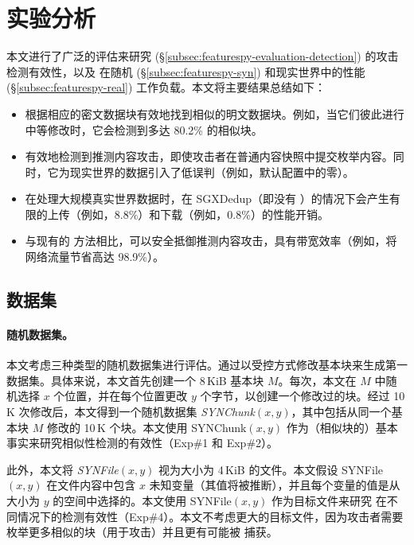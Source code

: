 \section{实验分析}
\label{sec:featurespy-evaluation}


本文进行了广泛的评估来研究 \sysnameF (\S\ref{subsec:featurespy-evaluation-detection}) 的攻击检测有效性，以及 \prototype 在随机 (\S\ref{subsec:featurespy-syn}) 和现实世界中的性能(\S\ref{subsec:featurespy-real}) 工作负载。本文将主要结果总结如下：

\begin{itemize}[leftmargin=*]
\item \sysnameF 根据相应的密文数据块有效地找到相似的明文数据块。例如，当它们彼此进行中等修改时，它会检测到多达 80.2\% 的相似块。
\item \sysnameF 有效地检测到推测内容攻击，即使攻击者在普通内容快照中提交枚举内容。同时，它为现实世界的数据引入了低误判（例如，默认配置中的零）。
\item \prototype 在处理大规模真实世界数据时，在 SGXDedup（即没有 \sysnameF）的情况下会产生有限的上传（例如，8.8\%）和下载（例如，0.8\%）的性能开销。
\item 与现有的 \cite{harnik2010side, li15} 方法相比，可以安全抵御推测内容攻击，\prototype 具有带宽效率（例如，将网络流量节省高达 98.9\%）。
\end{itemize}


\subsection{数据集}
\label{subsec:featurespy-datasets}

\paragraph*{随机数据集。}

本文考虑三种类型的随机数据集进行评估。通过以受控方式修改基本块来生成第一数据集。具体来说，本文首先创建一个 8\,KiB 基本块 $M$。每次，本文在 $M$ 中随机选择 $x$ 个位置，并在每个位置更改 $y$ 个字节，以创建一个修改过的块。经过 10\,K 次修改后，本文得到一个随机数据集 {\em SYNChunk}$(x, y)$，其中包括从同一个基本块 $M$ 修改的 10\,K 个块。本文使用 SYNChunk$(x, y)$ 作为（相似块的）基本事实来研究相似性检测的有效性（Exp\#1 和 Exp\#2）。

此外，本文将 {\em SYNFile}$(x, y)$ 视为大小为 4\,KiB 的文件。本文假设 SYNFile$(x, y)$ 在文件内容中包含 $x$ 未知变量（其值将被推断），并且每个变量的值是从大小为 $y$ 的空间中选择的。本文使用 SYNFile$(x, y)$ 作为目标文件来研究 \sysnameF 在不同情况下的检测有效性（Exp\#4）。本文不考虑更大的目标文件，因为攻击者需要枚举更多相似的块（用于攻击）并且更有可能被 \sysnameF 捕获。

